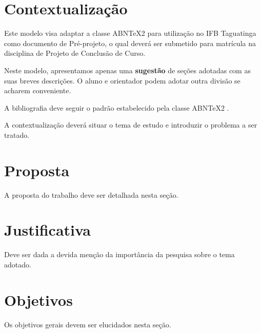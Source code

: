 \documentclass[licenciatura]{pre-projeto-computacao}
\begin{document}
\frenchspacing 
\imprimircapa
\imprimirfolhaderosto



\section*{Contextualização}
	Este modelo visa adaptar a classe ABNTeX2 para utilização no IFB Taguatinga como documento de Pré-projeto, o qual deverá ser submetido para matrícula na disciplina de Projeto de Conclusão de Curso.
	
	Neste modelo, apresentamos apenas uma \textbf{sugestão} de seções adotadas com as suas breves descrições. O aluno e orientador podem adotar outra divisão se acharem conveniente.
	
	A bibliografia deve seguir o padrão estabelecido pela classe ABNTeX2 \cite{abntex2modelo-relatorio}.
	
	A contextualização deverá situar o tema de estudo e introduzir o problema a ser tratado.

\section*{Proposta}
	A proposta do trabalho deve ser detalhada nesta seção.

\section*{Justificativa}
	Deve ser dada a devida menção da importância da pesquisa sobre o tema adotado.	

\section*{Objetivos}
	Os objetivos gerais devem ser elucidados nesta seção.


\end{document}
